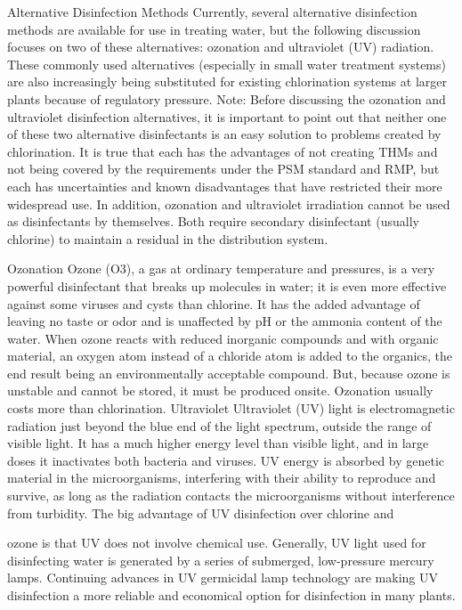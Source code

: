 \documentclass{article}
\begin{document}
Alternative Disinfection Methods Currently, several alternative
disinfection methods are available for use in treating water, but the
following discussion focuses on two of these alternatives: ozonation and
ultraviolet (UV) radiation. These commonly used alternatives (especially
in small water treatment systems) are also increasingly being
substituted for existing chlorination systems at larger plants because
of regulatory pressure. Note: Before discussing the ozonation and
ultraviolet disinfection alternatives, it is important to point out that
neither one of these two alternative disinfectants is an easy solution
to problems created by chlorination. It is true that each has the
advantages of not creating THMs and not being covered by the
requirements under the PSM standard and RMP, but each has uncertainties
and known disadvantages that have restricted their more widespread use.
In addition, ozonation and ultraviolet irradiation cannot be used as
disinfectants by themselves. Both require secondary disinfectant
(usually chlorine) to maintain a residual in the distribution system.

Ozonation Ozone (O3), a gas at ordinary temperature and pressures, is a
very powerful disinfectant that breaks up molecules in water; it is even
more effective against some viruses and cysts than chlorine. It has the
added advantage of leaving no taste or odor and is unaffected by pH or
the ammonia content of the water. When ozone reacts with reduced
inorganic compounds and with organic material, an oxygen atom instead of
a chloride atom is added to the organics, the end result being an
environmentally acceptable compound. But, because ozone is unstable and
cannot be stored, it must be produced onsite. Ozonation usually costs
more than chlorination. Ultraviolet Ultraviolet (UV) light is
electromagnetic radiation just beyond the blue end of the light
spectrum, outside the range of visible light. It has a much higher
energy level than visible light, and in large doses it inactivates both
bacteria and viruses. UV energy is absorbed by genetic material in the
microorganisms, interfering with their ability to reproduce and survive,
as long as the radiation contacts the microorganisms without
interference from turbidity. The big advantage of UV disinfection over
chlorine and

ozone is that UV does not involve chemical use. Generally, UV light used
for disinfecting water is generated by a series of submerged,
low-pressure mercury lamps. Continuing advances in UV germicidal lamp
technology are making UV disinfection a more reliable and economical
option for disinfection in many plants.
\end{document}
